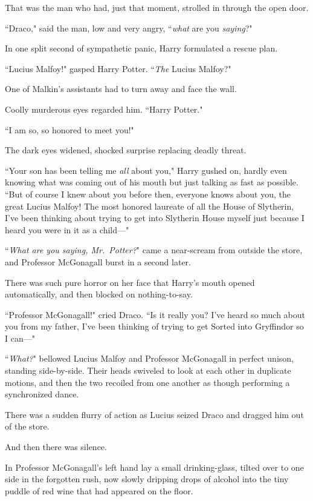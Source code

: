 That was the man who had, just that moment, strolled in through the open door.

``Draco," said the man, low and very angry, ``\emph{what} are you \emph{saying}?"

In one split second of sympathetic panic, Harry formulated a rescue plan.

``Lucius Malfoy!" gasped Harry Potter. ``\emph{The} Lucius Malfoy?"

One of Malkin's assistants had to turn away and face the wall.

Coolly murderous eyes regarded him. ``Harry Potter."

``I am so, so honored to meet you!"

The dark eyes widened, shocked surprise replacing deadly threat.

``Your son has been telling me \emph{all} about you," Harry gushed on, hardly even knowing what was coming out of his mouth but just talking as fast as possible. ``But of course I knew about you before then, everyone knows about you, the great Lucius Malfoy! The most honored laureate of all the House of Slytherin, I've been thinking about trying to get into Slytherin House myself just because I heard you were in it as a child---"

``\emph{What are you saying, Mr.~Potter?}" came a near-scream from outside the store, and Professor McGonagall burst in a second later.

There was such pure horror on her face that Harry's mouth opened automatically, and then blocked on nothing-to-say.

``Professor McGonagall!" cried Draco. ``Is it really you? I've heard so much about you from my father, I've been thinking of trying to get Sorted into Gryffindor so I can---"

``\emph{What?}" bellowed Lucius Malfoy and Professor McGonagall in perfect unison, standing side-by-side. Their heads swiveled to look at each other in duplicate motions, and then the two recoiled from one another as though performing a synchronized dance.

There was a sudden flurry of action as Lucius seized Draco and dragged him out of the store.

And then there was silence.

In Professor McGonagall's left hand lay a small drinking-glass, tilted over to one side in the forgotten rush, now slowly dripping drops of alcohol into the tiny puddle of red wine that had appeared on the floor.


